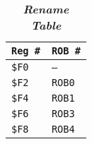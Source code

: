\begin{enumerate}
    \begin{table}[!htp]
        \centering
        \begin{tabular}{@{} l l @{}}
            \toprule
            \texttt{Reg \#}  & \texttt{ROB \#} \\
            \midrule
            \texttt{\$F0}    & \texttt{--} \\ [.3em]
            \texttt{\$F2}    & \texttt{ROB0} \\ [.3em]
            \texttt{\$F4}    & \texttt{ROB1} \\ [.3em]
            \texttt{\$F6}    & \texttt{ROB3} \\ [.3em]
            \texttt{\$F8}    & \texttt{ROB4} \\
            \bottomrule
        \end{tabular}
        \caption*{\emph{\textbf{Rename Table}}}
    \end{table}



\end{enumerate}
